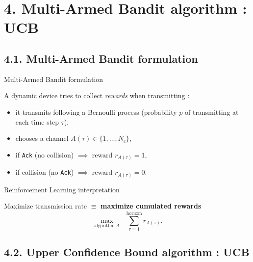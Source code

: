 \documentclass[12pt,english,ignorenonframetext,aspectratio=169,]{beamer}
\providecommand{\tightlist}{%
  \setlength{\itemsep}{0pt}\setlength{\parskip}{0pt}}
\begin{document}
\section{\hfill{}4. Multi-Armed Bandit algorithm : UCB\hfill{}}

\subsection{\hfill{}4.1. Multi-Armed Bandit formulation\hfill{}}

\begin{frame}[fragile]{Multi-Armed Bandit formulation}

A dynamic device tries to collect \emph{rewards} when transmitting :

\begin{itemize}
\tightlist
\item
  it transmits following a Bernoulli process \newline
   (probability \(p\) of transmitting at each time step \(\tau\)),
\item
  chooses a channel \(A(\tau) \in \{1,\dots,N_c\}\),
\item
  if \texttt{Ack} (no collision) \hspace*{10pt} \(\implies\) reward
  \(r_{A(\tau)} = 1\),
\item
  if collision (no \texttt{Ack}) \hspace*{10pt} \(\implies\) reward
  \(r_{A(\tau)} = 0\).
\end{itemize}

\pause

\begin{block}{Reinforcement Learning interpretation}

Maximize transmission rate \(\equiv\) \textbf{maximize cumulated
rewards}
\[\max_{\text{algorithm}\;A} \;\; \sum_{\tau=1}^{\text{horizon}} r_{A(\tau)}.\]

\end{block}

\end{frame}

\subsection{\hfill{}4.2. Upper Confidence Bound algorithm : UCB\hfill{}}
\end{document}
